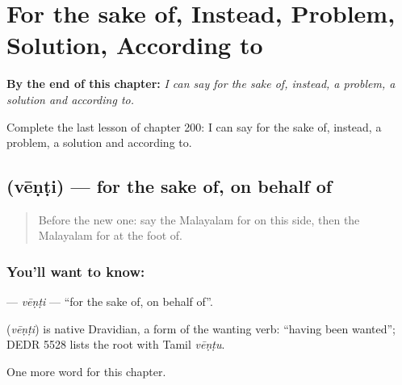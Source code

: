 
\chapter{For the sake of, Instead, Problem, Solution, According to}
\label{ch:ml-for-the-sake-of-instead-problem-solution-according-to}

\begin{chapteropening}
\textbf{By the end of this chapter:} \emph{I can say for the sake of, instead, a problem, a solution and according to.}

Complete the last lesson of chapter 200: I can say for the sake of, instead, a problem, a solution and according to.
\end{chapteropening}

\section[\texorpdfstring{\ml{വേണ്ടി} (vēṇṭi)}{വേണ്ടി (vēṇṭi)}]{ (vēṇṭi) — for the sake of, on behalf of}

\label{lesson:ML-C200-venti}



\begin{quote}
Before the new one: say the Malayalam for on this side, then the Malayalam for at the foot of.
\end{quote}

\subsection*{You'll want to know: }
\textbf{} — \emph{vēṇṭi} — \textquotedblleft{}for the sake of, on behalf of\textquotedblright{}.

\begin{cousinweb}
\textbf{} (\emph{vēṇṭi}) is native Dravidian, a form of the wanting verb: \textquotedblleft{}having been wanted\textquotedblright{}; DEDR 5528 lists the root with Tamil \emph{vēṇṭu}.
\end{cousinweb}

\begin{grammarlens}[title={What you've built}]
One more word for this chapter.
\end{grammarlens}

